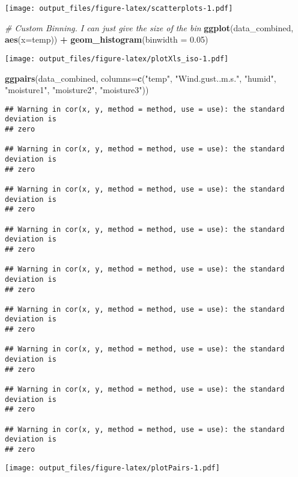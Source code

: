 \documentclass[]{article}
\newenvironment{Shaded}{\begin{snugshade}}{\end{snugshade}}
\newcommand{\KeywordTok}[1]{\textcolor[rgb]{0.13,0.29,0.53}{\textbf{#1}}}
\newcommand{\DataTypeTok}[1]{\textcolor[rgb]{0.13,0.29,0.53}{#1}}
\newcommand{\FloatTok}[1]{\textcolor[rgb]{0.00,0.00,0.81}{#1}}
\newcommand{\StringTok}[1]{\textcolor[rgb]{0.31,0.60,0.02}{#1}}
\newcommand{\CommentTok}[1]{\textcolor[rgb]{0.56,0.35,0.01}{\textit{#1}}}
\newcommand{\OperatorTok}[1]{\textcolor[rgb]{0.81,0.36,0.00}{\textbf{#1}}}
\newcommand{\NormalTok}[1]{#1}
\begin{document}
\texttt{[image: output\_files/figure-latex/scatterplots-1.pdf]}

\begin{Shaded}
\begin{Highlighting}[]
\CommentTok{# Custom Binning. I can just give the size of the bin}
\KeywordTok{ggplot}\NormalTok{(data_combined, }\KeywordTok{aes}\NormalTok{(}\DataTypeTok{x=}\NormalTok{temp)) }\OperatorTok{+}\StringTok{ }\KeywordTok{geom_histogram}\NormalTok{(}\DataTypeTok{binwidth =} \FloatTok{0.05}\NormalTok{)}
\end{Highlighting}
\end{Shaded}

\texttt{[image: output\_files/figure-latex/plotXls\_iso-1.pdf]}

\begin{Shaded}
\begin{Highlighting}[]
\KeywordTok{ggpairs}\NormalTok{(data_combined, }\DataTypeTok{columns=}\KeywordTok{c}\NormalTok{(}\StringTok{"temp"}\NormalTok{, }\StringTok{"Wind.gust..m.s."}\NormalTok{, }\StringTok{"humid"}\NormalTok{, }\StringTok{"moisture1"}\NormalTok{, }\StringTok{"moisture2"}\NormalTok{, }\StringTok{"moisture3"}\NormalTok{))}
\end{Highlighting}
\end{Shaded}

\begin{verbatim}
## Warning in cor(x, y, method = method, use = use): the standard deviation is
## zero

## Warning in cor(x, y, method = method, use = use): the standard deviation is
## zero

## Warning in cor(x, y, method = method, use = use): the standard deviation is
## zero

## Warning in cor(x, y, method = method, use = use): the standard deviation is
## zero

## Warning in cor(x, y, method = method, use = use): the standard deviation is
## zero

## Warning in cor(x, y, method = method, use = use): the standard deviation is
## zero

## Warning in cor(x, y, method = method, use = use): the standard deviation is
## zero

## Warning in cor(x, y, method = method, use = use): the standard deviation is
## zero

## Warning in cor(x, y, method = method, use = use): the standard deviation is
## zero
\end{verbatim}

\texttt{[image: output\_files/figure-latex/plotPairs-1.pdf]}
\end{document}
